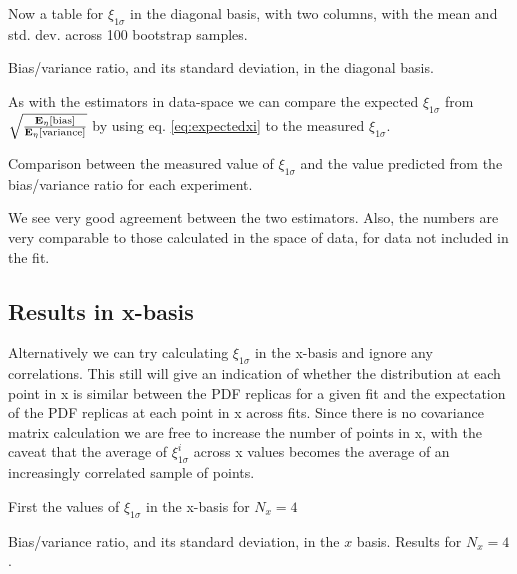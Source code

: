 \FloatBarrier

Now a table for $\xi_{1\sigma}$ in the diagonal basis, with two columns, with
the mean and std. dev. across 100 bootstrap samples.

\begin{table}[h!]
    \label{tab:latex_tables/pdf_xi_nx4}
    
    \caption{Bias/variance ratio, and its standard deviation, in the diagonal basis. }
\end{table}

\FloatBarrier

As with the estimators in data-space we can compare the expected $\xi_{1\sigma}$
from $\sqrt{\frac{\mathbf{E}_{\eta}\left[ {\rm bias} \right]}{\mathbf{E}_{\eta}\left[ {\rm variance} \right]}}$ by using eq. \eqref{eq:expectedxi}
to the measured $\xi_{1\sigma}$.

\begin{table}[h!]
    \label{tab:pdf_xicomp_nx4}
    
    \caption{Comparison between the measured value of $\xi_{1\sigma}$ and the value predicted from the bias/variance ratio for each experiment.}
\end{table}

We see very good agreement between the two estimators. Also, the numbers
are very comparable to those calculated in the space of data, for data not
included in the fit.

\subsection{Results in x-basis}

Alternatively we can try calculating $\xi_{1\sigma}$ in the x-basis and ignore
any correlations. This still will give an indication of whether the distribution
at each point in x is similar between the PDF replicas for a given fit and the 
expectation of the PDF replicas at each point in x across fits. Since there
is no covariance matrix calculation we are free to increase the number of points
in x, with the caveat that the average of $\xi_{1\sigma}^i$ across x values
becomes the average of an increasingly correlated sample of points.

First the values of $\xi_{1\sigma}$ in the x-basis for $N_x=4$

\begin{table}[h!]
    \label{tab:xbasis_xi_nx4}
    
    \caption{Bias/variance ratio, and its standard deviation, in the $x$ basis. Results for $N_x=4$. }
\end{table}

